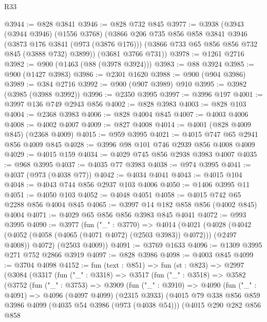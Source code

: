 \begin{lexlean}{R33}
\begin{coremodule}
@3944 := @828 @3841
@3946 := @828 @732 @845
@3977 := @3938
    (@3943
      (@3944 @3946)
      (@1556 @3768)
      (@3866
        @206
        @735
        @856
        @858
        @3841
        @3946
        (@3873 @176 @3841 (@973 (@3876 @176)))
        (@3866 @733 @65 @856 @856 @732 @845 (@3888 @732) @3899))
      (@3681 @3766 @731))
@3978 := @1261 @2716
@3982 := @900 (@1463 (@88 (@3978 @3924)))
@3983 := @88 @3924
@3985 := @900 (@1427 @3983)
@3986 := @2301 @1620
@3988 := @900 (@904 @3986)
@3989 := @384 @2716
@3992 := @900 (@907 @3989) @910
@3995 := @3982 (@3985 (@3988 @3992))
@3996 := @2350 @3995
@3997 := @3996 @197
@4001 := @3997 @136 @749 @2943 @856
@4002 := @828 @3983
@4003 := @828 @103
@4004 := @2368 @3983
@4006 := @828 @4004 @845
@4007 := @4003 @4006
@4008 := @4002 @4007
@4009 := @827 @4008
@4014 := @4001 (@828 @4009 @845) (@2368 @4009)
@4015 := @959 @3995
@4021 := @4015 @747 @65 @2941 @856 @4009 @845
@4028 := @3996 @98 @101 @746 @2939 @856 @4008 @4009
@4029 := @4015 @159
@4034 := @4029 @745 @856 @2938 @3983 @4007
@4035 := @968 @3995
@4037 := @4035 @77 @3983
@4038 := @974 @3995
@4041 := @4037 (@973 (@4038 @77))
@4042 := @4034 @4041
@4043 := @4015 @104
@4048 := @4043 @744 @856 @2937 @103 @4006
@4050 := @1406 @3995 @11
@4051 := @4050 @103
@4052 := @4048 @4051
@4058 := @4015 @742 @65 @2288 @856 @4004 @845
@4065 := @3997 @14 @182 @858 @856 (@4002 @845) @4004
@4071 := @4029 @65 @856 @856 @3983 @845 @4041
@4072 := @993 @3995
@4090 := @3977
    (fun ("_" : @3770) =>
    @4014
      (@4021
        (@4028 (@4042 (@4052 (@4058 (@4065 (@4071 @4072) (@2503 @3983)) @4072))) (@2497 @4008))
        @4072)
      (@2503 @4009))
@4091 := @3769 @1633
@4096 := @1309 @3995 @271 @752 @2866 @3919
@4097 := @828 @3986
@4098 := @4003 @845
@4099 := @3704 @4098
@4152 := fun (text : @851) =>
  fun (st : @823) =>
  @2997
    (@3084
      (@3317
        (fun ("_" : @3318) =>
        @3517
          (fun ("_" : @3518) =>
          @3582
            (@3752
              (fun ("_" : @3753) =>
              @3909
                (fun ("_" : @3910) =>
                @4090
                  (fun ("_" : @4091) =>
                  @4096
                    (@4097 @4099)
                    (@2315 @3933)
                    (@4015
                      @79
                      @338
                      @856
                      @859
                      @3986
                      @4099
                      (@4035 @54 @3986 (@973 (@4038 @54)))
                      (@4015
                        @290
                        @282
                        @856
                        @858

\end{coremodule}
\end{lexlean}
